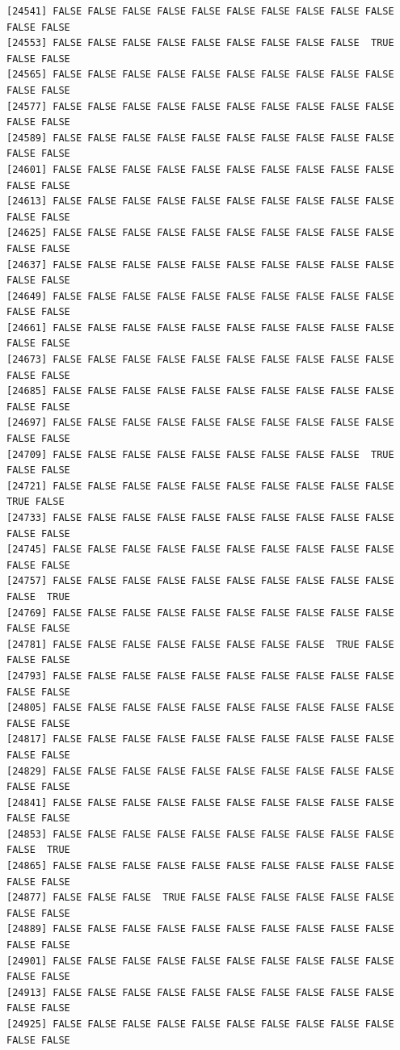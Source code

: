 \documentclass[
  a4paper,
  DIV=11,
  numbers=noendperiod]{scrartcl}
\begin{document}
\begin{verbatim}
[24541] FALSE FALSE FALSE FALSE FALSE FALSE FALSE FALSE FALSE FALSE FALSE FALSE
[24553] FALSE FALSE FALSE FALSE FALSE FALSE FALSE FALSE FALSE  TRUE FALSE FALSE
[24565] FALSE FALSE FALSE FALSE FALSE FALSE FALSE FALSE FALSE FALSE FALSE FALSE
[24577] FALSE FALSE FALSE FALSE FALSE FALSE FALSE FALSE FALSE FALSE FALSE FALSE
[24589] FALSE FALSE FALSE FALSE FALSE FALSE FALSE FALSE FALSE FALSE FALSE FALSE
[24601] FALSE FALSE FALSE FALSE FALSE FALSE FALSE FALSE FALSE FALSE FALSE FALSE
[24613] FALSE FALSE FALSE FALSE FALSE FALSE FALSE FALSE FALSE FALSE FALSE FALSE
[24625] FALSE FALSE FALSE FALSE FALSE FALSE FALSE FALSE FALSE FALSE FALSE FALSE
[24637] FALSE FALSE FALSE FALSE FALSE FALSE FALSE FALSE FALSE FALSE FALSE FALSE
[24649] FALSE FALSE FALSE FALSE FALSE FALSE FALSE FALSE FALSE FALSE FALSE FALSE
[24661] FALSE FALSE FALSE FALSE FALSE FALSE FALSE FALSE FALSE FALSE FALSE FALSE
[24673] FALSE FALSE FALSE FALSE FALSE FALSE FALSE FALSE FALSE FALSE FALSE FALSE
[24685] FALSE FALSE FALSE FALSE FALSE FALSE FALSE FALSE FALSE FALSE FALSE FALSE
[24697] FALSE FALSE FALSE FALSE FALSE FALSE FALSE FALSE FALSE FALSE FALSE FALSE
[24709] FALSE FALSE FALSE FALSE FALSE FALSE FALSE FALSE FALSE  TRUE FALSE FALSE
[24721] FALSE FALSE FALSE FALSE FALSE FALSE FALSE FALSE FALSE FALSE  TRUE FALSE
[24733] FALSE FALSE FALSE FALSE FALSE FALSE FALSE FALSE FALSE FALSE FALSE FALSE
[24745] FALSE FALSE FALSE FALSE FALSE FALSE FALSE FALSE FALSE FALSE FALSE FALSE
[24757] FALSE FALSE FALSE FALSE FALSE FALSE FALSE FALSE FALSE FALSE FALSE  TRUE
[24769] FALSE FALSE FALSE FALSE FALSE FALSE FALSE FALSE FALSE FALSE FALSE FALSE
[24781] FALSE FALSE FALSE FALSE FALSE FALSE FALSE FALSE  TRUE FALSE FALSE FALSE
[24793] FALSE FALSE FALSE FALSE FALSE FALSE FALSE FALSE FALSE FALSE FALSE FALSE
[24805] FALSE FALSE FALSE FALSE FALSE FALSE FALSE FALSE FALSE FALSE FALSE FALSE
[24817] FALSE FALSE FALSE FALSE FALSE FALSE FALSE FALSE FALSE FALSE FALSE FALSE
[24829] FALSE FALSE FALSE FALSE FALSE FALSE FALSE FALSE FALSE FALSE FALSE FALSE
[24841] FALSE FALSE FALSE FALSE FALSE FALSE FALSE FALSE FALSE FALSE FALSE FALSE
[24853] FALSE FALSE FALSE FALSE FALSE FALSE FALSE FALSE FALSE FALSE FALSE  TRUE
[24865] FALSE FALSE FALSE FALSE FALSE FALSE FALSE FALSE FALSE FALSE FALSE FALSE
[24877] FALSE FALSE FALSE  TRUE FALSE FALSE FALSE FALSE FALSE FALSE FALSE FALSE
[24889] FALSE FALSE FALSE FALSE FALSE FALSE FALSE FALSE FALSE FALSE FALSE FALSE
[24901] FALSE FALSE FALSE FALSE FALSE FALSE FALSE FALSE FALSE FALSE FALSE FALSE
[24913] FALSE FALSE FALSE FALSE FALSE FALSE FALSE FALSE FALSE FALSE FALSE FALSE
[24925] FALSE FALSE FALSE FALSE FALSE FALSE FALSE FALSE FALSE FALSE FALSE FALSE

\end{verbatim}
\end{document}
